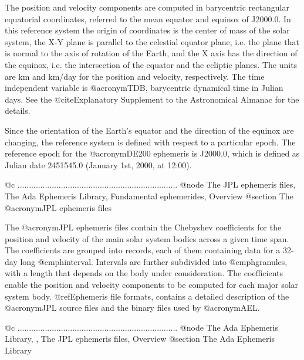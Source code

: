 The position and velocity components are computed in barycentric
rectangular equatorial coordinates, referred to the mean equator and
equinox of J2000.0. In this reference system the origin of coordinates
is the center of mass of the solar system, the X-Y plane is parallel
to the celestial equator plane, i.e. the plane that is normal to the
axis of rotation of the Earth, and the X axis has the direction of the
equinox, i.e. the intersection of the equator and the ecliptic planes.
The units are km and km/day for the position and velocity,
respectively.  The time independent variable is @acronym{TDB,
barycentric dynamical time} in Julian days.  See the @cite{Explanatory
Supplement to the Astronomical Almanac} for the details.

Since the orientation of the Earth's equator and the direction of the
equinox are changing, the reference system is defined with respect to
a particular epoch.  The reference epoch for the @acronym{DE200}
ephemeris is J2000.0, which is defined as Julian date 2451545.0
(January 1st, 2000, at 12:00).

@c ......................................................................
@node The JPL ephemeris files, The Ada Ephemeris Library, Fundamental ephemerides, Overview
@section The @acronym{JPL} ephemeris files

The @acronym{JPL} ephemeris files contain the Chebyshev coefficients
for the position and velocity of the main solar system bodies across a
given time span. The coefficients are grouped into records, each of
them containing data for a 32-day long @emph{interval}. Intervals are
further subdivided into @emph{granules}, with a length that depends on
the body under consideration. The coefficients enable the position and
velocity components to be computed for each major solar system
body. @ref{Ephemeris file formats}, contains a detailed description of
the @acronym{JPL} source files and the binary files used by
@acronym{AEL}.

@c ......................................................................
@node The Ada Ephemeris Library,  , The JPL ephemeris files, Overview
@section The Ada Ephemeris Library


